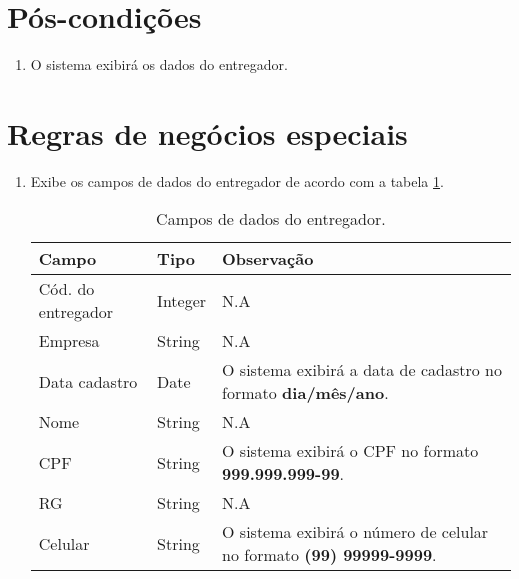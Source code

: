\section{Pós-condições}

\begin{enumerate}
	\item O sistema exibirá os dados do entregador.	
\end{enumerate}

\section{Regras de negócios especiais}

\begin{enumerate}[label=RN\arabic*]
	\item Exibe os campos de dados do entregador de acordo com a tabela \ref{uc016_tb_rn1}. \label{uc016_rn:1}
	\begin{table}[htb]
		\ABNTEXfontereduzida
		\caption[Campos de dados do entregador]{Campos de dados do entregador.}
		\label{uc016_tb_rn1}
		\begin{tabular}{|p{4.0cm}|p{3.0cm}|p{7.25cm}|}
			\hline
			\textbf{Campo}     & \textbf{Tipo} & \textbf{Observação}                                                        \\ \hline
			Cód. do entregador & Integer       & N.A                                                                        \\ \hline
			Empresa            & String        & N.A                                                                        \\ \hline
			Data cadastro      & Date          & O sistema exibirá a data de cadastro no formato \textbf{dia/mês/ano}.      \\ \hline
			Nome               & String        & N.A                                                                        \\ \hline
			CPF                & String        & O sistema exibirá o CPF no formato \textbf{999.999.999-99}.                \\ \hline
			RG                 & String        & N.A                                                                        \\ \hline
			Celular            & String        & O sistema exibirá o número de celular no formato \textbf{(99) 99999-9999}. \\ \hline
		\end{tabular}
	\end{table}
\end{enumerate}